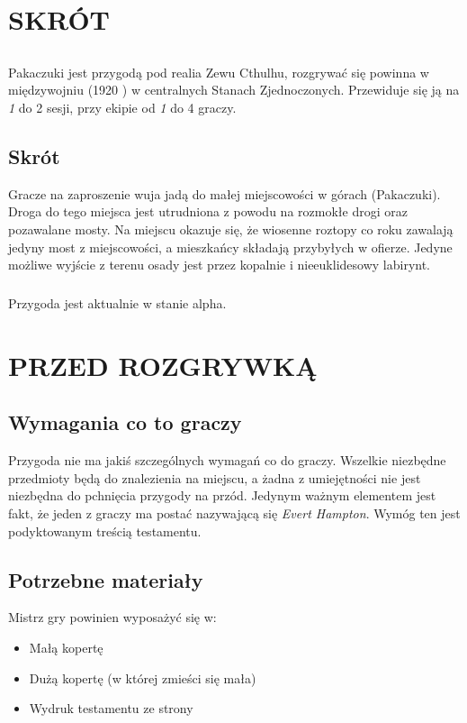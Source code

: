 \documentclass[ms,a4paper]{memoir}
\newcommand{\red}[1]{\textcolor{red!50!black}{#1}}
\newcommand{\RED}[1]{\textcolor{red!50!black}{\MakeUppercase{#1}}}
\begin{document}
\chapter{\RED{Skrót}}
\section{}
\paragraph{}
Pakaczuki jest przygodą pod realia Zewu Cthulhu, rozgrywać się powinna w międzywojniu (1920 )
w centralnych Stanach Zjednoczonych. Przewiduje się ją na \emph{1} do 2 sesji, przy ekipie od \emph{1} do 4 graczy.\\
\section{Skrót}
Gracze na zaproszenie wuja jadą do małej miejscowości w górach (Pakaczuki).
Droga do tego miejsca jest utrudniona z powodu na rozmokłe drogi oraz pozawalane mosty.
Na miejscu okazuje się, że wiosenne roztopy co roku zawalają jedyny most z miejscowości, a mieszkańcy składają przybyłych w ofierze.
Jedyne możliwe wyjście z terenu osady jest przez kopalnie i  nieeuklidesowy labirynt.
\paragraph{}
Przygoda jest aktualnie w stanie \red{alpha}.
\newpage
\tableofcontents
\newpage

\chapter{\RED{Przed rozgrywką}}

\section{Wymagania co to graczy}
Przygoda nie ma jakiś szczególnych wymagań co do graczy.
Wszelkie niezbędne przedmioty będą do znalezienia na miejscu,
a żadna z umiejętności nie jest niezbędna do pchnięcia przygody
na przód. Jedynym ważnym elementem jest fakt, że jeden z graczy
ma postać nazywającą się \emph{Evert Hampton}. Wymóg ten jest
podyktowanym treścią testamentu.
\section{Potrzebne materiały}
Mistrz gry powinien wyposażyć się w:
\begin{itemize}
\item Małą kopertę
\item Dużą kopertę (w której zmieści się mała)
\item Wydruk testamentu ze strony %
\end{itemize}
\end{document}
